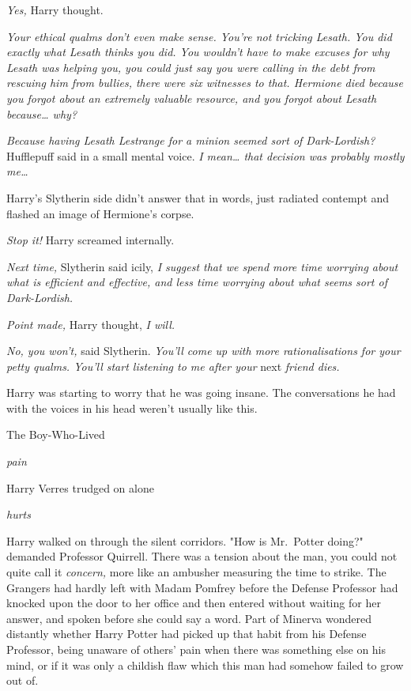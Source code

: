 \emph{Yes,} Harry thought.

\emph{Your ethical qualms don't even make sense. You're not tricking Lesath. 
You did exactly what Lesath thinks you did. You wouldn't have to make excuses 
for why Lesath was helping you, you could just say you were calling in the debt 
from rescuing him from bullies, there were six witnesses to that. Hermione died 
because you forgot about an extremely valuable resource, and you forgot about 
Lesath because{\ldots} why?}

\emph{Because having Lesath Lestrange for a minion seemed sort of 
Dark-Lordish?} Hufflepuff said in a small mental voice. \emph{I mean{\ldots} 
that decision was probably mostly me{\ldots}}

Harry's Slytherin side didn't answer that in words, just radiated contempt and 
flashed an image of Hermione's corpse.

\emph{Stop it!} Harry screamed internally.

\emph{Next time,} Slytherin said icily, \emph{I suggest that we spend more time 
worrying about what is efficient and effective, and less time worrying about 
what seems sort of Dark-Lordish.}

\emph{Point made,} Harry thought, \emph{I will.}

\emph{No, you won't,} said Slytherin. \emph{You'll come up with more 
rationalisations for your petty qualms. You'll start listening to me after 
your} next \emph{friend dies.}

Harry was starting to worry that he was going insane. The conversations he had 
with the voices in his head weren't usually like this.

The Boy-Who-Lived

\emph{pain}

Harry Verres trudged on alone

\emph{hurts}

Harry walked on through the silent corridors.
\sbreak
"How is Mr.~Potter doing?" demanded Professor Quirrell. There was a tension 
about the man, you could not quite call it \emph{concern,} more like an 
ambusher measuring the time to strike. The Grangers had hardly left with Madam 
Pomfrey before the Defense Professor had knocked upon the door to her office 
and then entered without waiting for her answer, and spoken before she could 
say a word. Part of Minerva wondered distantly whether Harry Potter had picked 
up that habit from his Defense Professor, being unaware of others' pain when 
there was something else on his mind, or if it was only a childish flaw which 
this man had somehow failed to grow out of.

